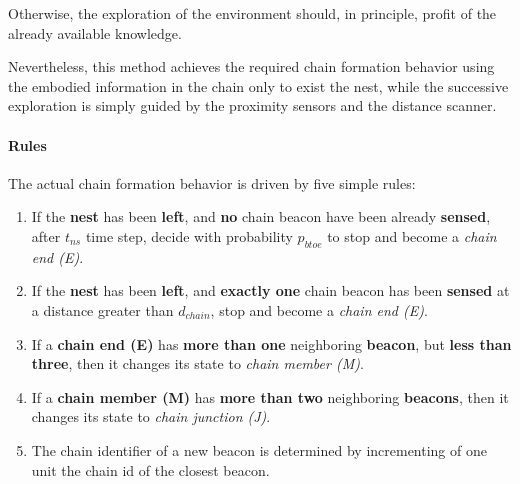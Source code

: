 Otherwise, the exploration of the environment should, in principle, profit of the already available knowledge.

Nevertheless, this method achieves the required chain formation behavior using the embodied information in the chain only to exist the nest, while the successive exploration is simply guided by the proximity sensors and the distance scanner.
 

\paragraph{Rules}\label{par:rules}
The actual chain formation behavior is driven by five simple rules:
\begin{enumerate}
  \item If the \textbf{nest} has been \textbf{left}, and \textbf{no} chain beacon have been already \textbf{sensed}, after $t_{ns}$ time step, decide with probability $p_{btoe}$ to stop and become a \emph{chain end (E)}.
  \item If the \textbf{nest} has been \textbf{left}, and \textbf{exactly one} chain beacon has been \textbf{sensed} at a distance greater than $d_{chain}$, stop and become a \emph{chain end (E)}.
  \item If a \textbf{chain end (E)} has \textbf{more than one} neighboring\textbf{ beacon}, but \textbf{less than three}, then it changes its state to \emph{chain member (M)}.
  \item If a \textbf{chain member (M)} has \textbf{more than two} neighboring \textbf{beacons}, then it changes its state to \emph{chain junction (J)}.
  \item The chain identifier of a new beacon is determined by incrementing of one unit the chain id of the closest beacon.
\end{enumerate}

\begin{center}
\end{center}

